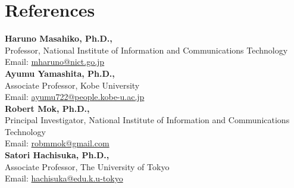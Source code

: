 \documentclass[letterpaper,10.5pt]{article}
\begin{document}
\section*{References}
\textbf{Haruno Masahiko, Ph.D.,} \\ 
Professor, National Institute of Information and Communications Technology \\ 
Email: \href{mailto:mharuno@nict.go.jp}{mharuno@nict.go.jp}\vspace{5pt} \\ 
\textbf{Ayumu Yamashita, Ph.D.,} \\ 
Associate Professor, Kobe University \\ 
Email: \href{mailto:ayumu722@people.kobe-u.ac.jp}{ayumu722@people.kobe-u.ac.jp}\vspace{5pt} \\ 
\textbf{Robert Mok, Ph.D.,} \\ 
Principal Investigator, National Institute of Information and Communications Technology \\ 
Email: \href{mailto:robmmok@gmail.com}{robmmok@gmail.com}\vspace{5pt} \\ 
\textbf{Satori Hachisuka, Ph.D.,} \\ 
Associate Professor, The University of Tokyo \\ 
Email: \href{mailto:hachisuka@edu.k.u-tokyo}{hachisuka@edu.k.u-tokyo}\vspace{5pt} \\ 
\end{document}
